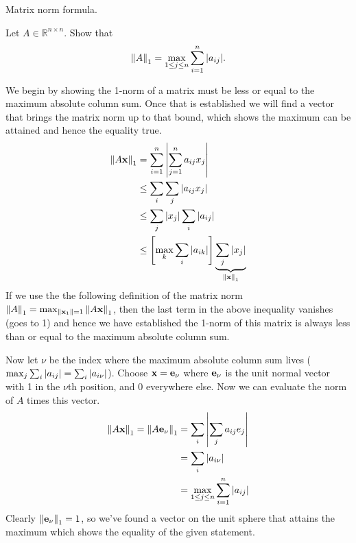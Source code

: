 \documentclass[boxes,pages]{homework}
\begin{document}
\begin{problem}
Matrix norm formula.

Let $A\in\mathbb{R}^{n\times n}$. Show that
\begin{equation*}
	\norm{A}_1 = \max_{1\leq j \leq n}\sum_{i = 1}^n\abs{a_{ij}}.
\end{equation*}
\end{problem}

\begin{solution}
	We begin by showing the 1-norm of a matrix must be less or equal to the maximum absolute column sum. Once that is established we will find a vector that brings the matrix norm up to that bound, which shows the maximum can be attained and hence the equality true.
	\begin{align*}
		\norm{A\vb{x}}_1 & = \sum_{i = 1}^n\abs{\sum_{j = 1}^n a_{ij}x_j}                                    \\
		                 & \leq \sum_i\sum_j\abs{a_{ij}x_j}                                                  \\
		                 & \leq \sum_j\abs{x_j}\sum_i\abs{a_{ij}}                                            \\
		                 & \leq \qty[\max_k\sum_i\abs{a_{ik}}]\underbrace{\sum_j\abs{x_j}}_{\norm{\vb{x}}_1}
	\end{align*}
	If we use the the following definition of the matrix norm $\norm{A}_1 = \max_{\norm{\vb{x}_1} = 1}\norm{A\vb{x}}_1$, then the last term in the above inequality vanishes (goes to 1) and hence we have established the 1-norm of this matrix is always less than or equal to the maximum absolute column sum.

	Now let $\nu$ be the index where the maximum absolute column sum lives ($\max_j\sum_i\abs{a_{ij}} = \sum_i\abs{a_{i\nu}}$). Choose $\vb{x} = \vb{e}_\nu$ where $\vb{e}_\nu$ is the unit normal vector with 1 in the $\nu$th position, and 0 everywhere else. Now we can evaluate the norm of $A$ times this vector.
	\begin{align*}
		\norm{A\vb{x}}_1 = \norm{A\vb{e}_\nu}_1 & = \sum_i\abs{\sum_j a_{ij}e_j}                    \\
		                                        & = \sum_i\abs{a_{i\nu}}                            \\
		                                        & = \max_{1\leq j \leq n}\sum_{i = 1}^n\abs{a_{ij}}
	\end{align*}
	Clearly $\norm{\vb{e}_\nu}_1 = 1$, so we've found a vector on the unit sphere that attains the maximum which shows the equality of the given statement.
\end{solution}
\end{document}
